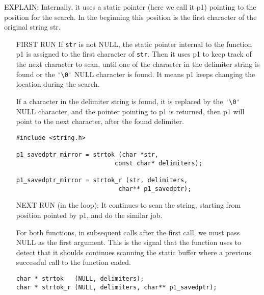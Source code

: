 
EXPLAIN: Internally, it uses a static pointer (here we call it p1) pointing to
the position for the search. In the beginning this position is
the first character of the original string str.
\begin{itemize}
  
  \item [FIRST RUN] If \verb!str! is not NULL, the static pointer internal to
  the function p1 is assigned to the first character of \verb!str!.
  Then it uses p1 to keep track of the next character to scan, until one of the
  character in the delimiter string is found or the \verb!'\0'! NULL character
  is found. It means p1 keeps changing the location during the search.
  
  If a character in the delimiter string is found, it is replaced by the
  \verb!'\0'! NULL character, and the pointer pointing to p1 is returned, then
  p1 will point to the next character, after the found delimiter.
  
\begin{verbatim}
#include <string.h>

p1_savedptr_mirror = strtok (char *str, 
                           const char* delimiters);

p1_savedptr_mirror = strtok_r (str, delimiters, 
                            char** p1_savedptr);
\end{verbatim}  

  \item [NEXT RUN] (in the loop): It continues to scan the string, starting from
  position pointed by p1, and do the similar job.
   
   For both functions, in subsequent calls after the first call, we must pass
   NULL as the first argument. This is the signal that the function uses to
   detect that it shoulds continues scanning the static buffer where a previous
   successful call to the function ended. 
\begin{verbatim}
char * strtok   (NULL, delimiters);
char * strtok_r (NULL, delimiters, char** p1_savedptr);
\end{verbatim}


\end{itemize}

